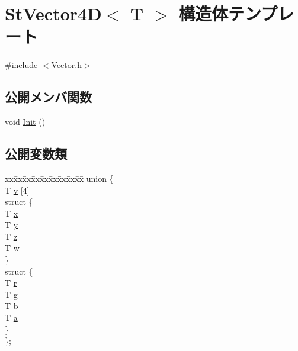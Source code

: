 \hypertarget{struct_st_vector4_d}{}\section{St\+Vector4\+D$<$ T $>$ 構造体テンプレート}
\label{struct_st_vector4_d}


{\ttfamily \#include $<$Vector.\+h$>$}

\subsection*{公開メンバ関数}
\begin{DoxyCompactItemize}
\item 
void \hyperlink{struct_st_vector4_d_a9ecb571ef82ec87201c7ef91b914600f}{Init} ()
\end{DoxyCompactItemize}
\subsection*{公開変数類}
\begin{DoxyCompactItemize}
\item 
\begin{tabbing}
xx\=xx\=xx\=xx\=xx\=xx\=xx\=xx\=xx\=\kill
union \{\\
\>T \hyperlink{struct_st_vector4_d_aaf1b5a26096eb845f0d52159113ae3d6}{v} \mbox{[}4\mbox{]}\\
\>struct \{\\
\>\>T \hyperlink{struct_st_vector4_d_aaf15e749d85e25511c9359846a7188b5}{x}\\
\>\>T \hyperlink{struct_st_vector4_d_a475be5605b39441e36b14883d96d838e}{y}\\
\>\>T \hyperlink{struct_st_vector4_d_a3b66d5401355352473b13e4a4503de2e}{z}\\
\>\>T \hyperlink{struct_st_vector4_d_a58c1b67690dadae888dc06b3313b8753}{w}\\
\>\} \\
\>struct \{\\
\>\>T \hyperlink{struct_st_vector4_d_af60a222a97c535600301f228d1a08bfc}{r}\\
\>\>T \hyperlink{struct_st_vector4_d_accaccfdf6ea098dc2021032bf80b2914}{g}\\
\>\>T \hyperlink{struct_st_vector4_d_a91d8b66e466179333e7dee8816454914}{b}\\
\>\>T \hyperlink{struct_st_vector4_d_ab07c6b66109024036a5bf168f3d0f88c}{a}\\
\>\} \\
\}; \\

\end{tabbing}\end{DoxyCompactItemize}


